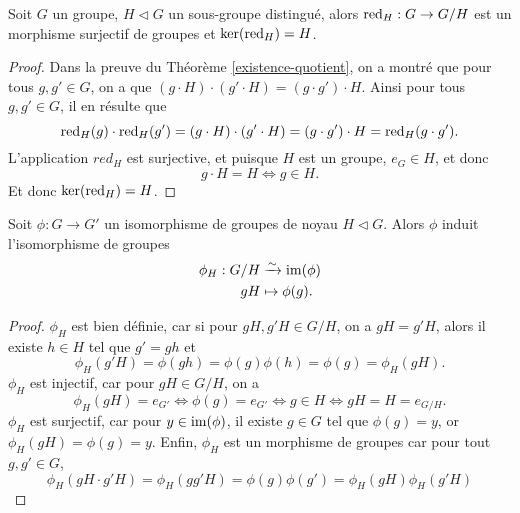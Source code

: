 \begin{prop}
	Soit $G$ un groupe, $H \triangleleft G$ un sous-groupe distingué,
	alors $\operatorname{red}_H : G \to G/H$ est un morphisme surjectif de groupes
	et $\ker(\operatorname{red}_H) = H$.
\end{prop}

\begin{proof}	
	Dans la preuve du Théorème \ref{existence-quotient}, on a montré que pour tous
	$g, g' \in G$, on a que $(g \cdot H) \cdot (g' \cdot H) = (g \cdot g') \cdot H$.
	Ainsi pour tous $g, g' \in G$, il en résulte que
	\begin{equation*}
		\operatorname{red}_H(g) \cdot \operatorname{red}_H(g') = (g \cdot H) \cdot (g' \cdot H)
		= (g \cdot g') \cdot H = \operatorname{red}_H(g \cdot g').
	\end{equation*}
	L'application $red_H$ est surjective, et puisque $H$ est un groupe, $e_G \in H$,
	et donc
	\begin{equation*}
		g \cdot H = H \iff g \in H.	
	\end{equation*}
	Et donc $\ker(\operatorname{red}_H) = H$.
\end{proof}


\begin{thm}
	\label{noyau-image}
	Soit $\phi : G \to G'$ un isomorphisme de groupes de noyau $H \triangleleft G$.
	Alors $\phi$ induit l'isomorphisme de groupes
	\begin{align*}
		\phi_H: G/H &\xrightarrow{\sim} \operatorname{im}(\phi)\\
		g H &\mapsto \phi(g).
	\end{align*}
\end{thm}

\begin{proof}
	$\phi_H$ est bien définie, car si pour $g H, g'H \in G/H$, on a $gH = g'H$,
	alors il existe $h \in H$ tel que $g' = gh$ et
	\begin{equation*}
		\phi_H(g'H) = \phi(gh) = \phi(g)\phi(h) = \phi(g) = \phi_H(gH).
	\end{equation*}
	$\phi_H$ est injectif, car pour $gH \in G/H$, on a
	\begin{equation*}
		\phi_H(gH) = e_{G'} \iff \phi(g) = e_{G'} \iff g \in H \iff gH = H = e_{G/H}.
	\end{equation*}
	$\phi_H$ est surjectif, car pour $y \in \operatorname{im}(\phi)$, il existe $g \in G$ 
	tel que $\phi(g) = y$, or $\phi_H(gH) = \phi(g) = y$.
	Enfin, $\phi_H$ est un morphisme de groupes car pour tout $g, g' \in G$,
	\begin{equation*}
		\phi_H(gH \cdot g'H) = \phi_H(gg'H) = \phi(g)\phi(g') = \phi_H(gH)\phi_H(g'H)
	\end{equation*}
\end{proof}

